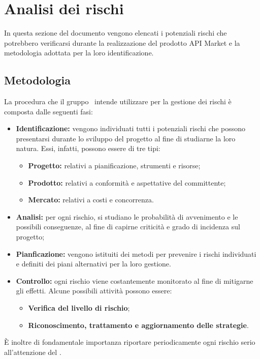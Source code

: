 \newpage
\section{Analisi dei rischi}
In questa sezione del documento vengono elencati i potenziali rischi che potrebbero verificarsi durante la realizzazione del prodotto API Market e la metodologia adottata per la loro identificazione.

\subsection{Metodologia}

La procedura che il gruppo \gruppo\ intende utilizzare per la gestione dei rischi è composta dalle seguenti fasi:
\begin{itemize}
	\item \textbf{Identificazione:} vengono individuati tutti i potenziali rischi che possono presentarsi durante lo sviluppo del progetto al fine di studiarne la loro natura. Essi, infatti, possono essere di tre tipi:
	\begin{itemize}
		\item \textbf{Progetto:} relativi a pianificazione, strumenti e risorse;
		\item \textbf{Prodotto:} relativi a conformità e aspettative del committente;
		\item \textbf{Mercato:} relativi a costi e concorrenza.
	\end{itemize}
	\item \textbf{Analisi:} per ogni rischio, si studiano le probabilità di avvenimento e le possibili conseguenze, al fine di capirne criticità e grado di incidenza sul progetto;
	\item \textbf{Pianficazione:} vengono istituiti dei metodi  per prevenire i rischi individuati e definiti dei piani alternativi per la loro gestione.
	\item \textbf{Controllo:} ogni rischio viene costantemente monitorato al fine di mitigarne gli effetti. Alcune possibili attività possono essere:
		\begin{itemize}
		\item \textbf{Verifica del livello di rischio};
		\item \textbf{Riconoscimento, trattamento e aggiornamento delle strategie}.
		\end{itemize}
	\end{itemize}
\MakeUppercase{è} inoltre di fondamentale importanza riportare periodicamente ogni rischio serio all'attenzione del \textit{\RdP}.

